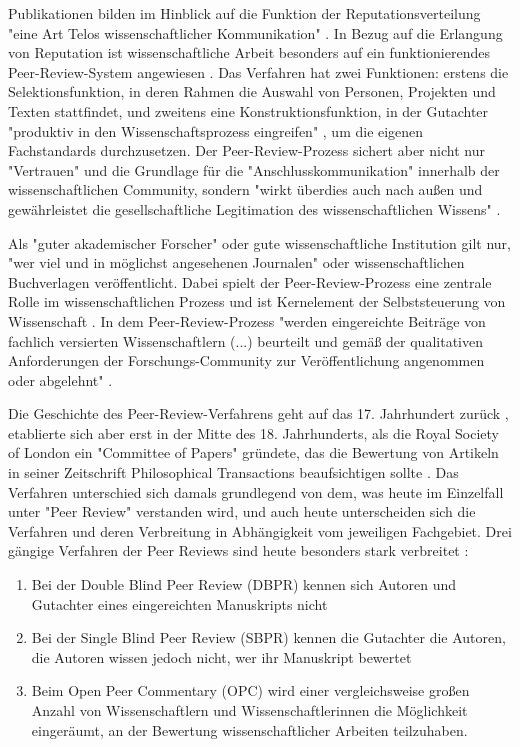 Publikationen bilden im Hinblick auf die Funktion der Reputationsverteilung "eine Art Telos wissenschaftlicher Kommunikation" \cite{hirschauer2004peer}. In Bezug auf die Erlangung von Reputation ist wissenschaftliche Arbeit besonders auf ein funktionierendes Peer-Review-System angewiesen \cite{Luescher_2014}. Das Verfahren hat zwei Funktionen: erstens die Selektionsfunktion, in deren Rahmen die Auswahl von Personen, Projekten und Texten stattfindet, und zweitens eine Konstruktionsfunktion, in der Gutachter "produktiv in den Wissenschaftsprozess eingreifen" \cite{Neidhardt_2010}, um die eigenen Fachstandards durchzusetzen. Der Peer-Review-Prozess sichert aber nicht nur "Vertrauen" und die Grundlage für die "Anschlusskommunikation" innerhalb der wissenschaftlichen Community, sondern "wirkt überdies auch nach außen und gewährleistet die gesellschaftliche Legitimation des wissenschaftlichen Wissens" \cite{pscheida_2010_wikipedia}.

Als "guter akademischer Forscher" oder gute wissenschaftliche Institution gilt nur, "wer viel und in möglichst angesehenen Journalen" \cite{Frey_2005} oder wissenschaftlichen Buchverlagen veröffentlicht. Dabei spielt der Peer-Review-Prozess eine zentrale Rolle im wissenschaftlichen Prozess \cite{smith_1999_opening} und ist Kernelement der Selbststeuerung von Wissenschaft \cite[:5]{Neidhardt_2010}. In dem Peer-Review-Prozess "werden eingereichte Beiträge von fachlich versierten Wissenschaftlern (...) beurteilt und gemäß der qualitativen Anforderungen der Forschungs-Community zur Veröffentlichung angenommen oder abgelehnt" \cite{Hess_2006}.

Die Geschichte des Peer-Review-Verfahrens geht auf das 17. Jahrhundert zurück \cite{Kronick_1978}, etablierte sich aber erst in der Mitte des 18. Jahrhunderts, als die Royal Society of London ein "Committee of Papers" gründete, das die Bewertung von Artikeln in seiner Zeitschrift Philosophical Transactions beaufsichtigen sollte \cite{Kronick_1990}. Das Verfahren unterschied sich damals grundlegend von dem, was heute im Einzelfall unter "Peer Review" verstanden wird, und auch heute unterscheiden sich die Verfahren und deren Verbreitung in Abhängigkeit vom jeweiligen Fachgebiet. Drei gängige Verfahren der Peer Reviews sind heute besonders stark verbreitet \cite{mueller_2009_peerreview}:
\begin{enumerate}
\item Bei der Double Blind Peer Review (DBPR) kennen sich Autoren und Gutachter eines eingereichten Manuskripts nicht
\item Bei der Single Blind Peer Review (SBPR) kennen die Gutachter die Autoren, die Autoren wissen jedoch nicht, wer ihr Manuskript bewertet
\item Beim Open Peer Commentary (OPC) wird einer vergleichsweise großen Anzahl von Wissenschaftlern und Wissenschaftlerinnen die Möglichkeit eingeräumt, an der Bewertung wissenschaftlicher Arbeiten teilzuhaben.
\end{enumerate}

